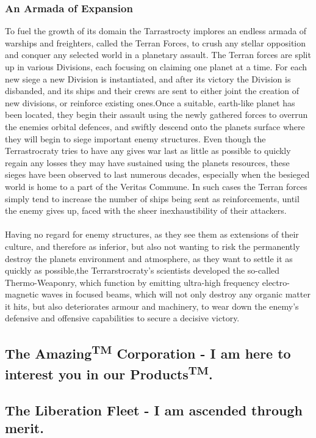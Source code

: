 \documentclass[a4paper,12pt]{book}
\begin{document}
\subsubsection*{An Armada of Expansion}
To fuel the growth of its domain the Tarrastrocty implores an endless armada of warships and freighters, called the Terran Forces, to crush any stellar opposition and conquer any selected world in a planetary assault. The Terran forces are split up in various Divisions, each focusing on claiming one planet at a time. For each new siege a new Division is instantiated, and after its victory the Division is disbanded, and its ships and their crews are sent to either joint the creation of new divisions, or reinforce existing ones.Once a suitable, earth-like planet has been located, they begin their assault using the newly gathered forces to overrun the enemies orbital defences, and swiftly descend onto the planets surface where they will begin to siege important enemy structures. Even though the Terrastrocraty tries to have any gives war last as little as possible to quickly regain any losses they may have sustained using the planets resources, these sieges have been observed to last numerous decades, especially when the besieged world is home to a part of the Veritas Commune. In such cases the Terran forces simply tend to increase the number of ships being sent as reinforcements, until the enemy gives up, faced with the sheer inexhaustibility of their attackers.\\
\\
Having no regard for enemy structures, as they see them as extensions of their culture, and therefore as inferior, but also not wanting to risk the permanently destroy the planets environment and atmosphere, as they want to settle it as quickly as possible,the Terrarstrocraty's scientists developed the so-called Thermo-Weaponry, which function by emitting ultra-high frequency electro-magnetic waves in focused beams, which will not only destroy any organic matter it hits, but also deteriorates armour and machinery, to wear down the enemy's defensive and offensive capabilities to secure a decisive victory.   


\subsection{The Amazing\textsuperscript{TM} Corporation - I am here to interest you in our Products\textsuperscript{TM}.}

\subsection{The Liberation Fleet - I am ascended through merit.}
\end{document}
